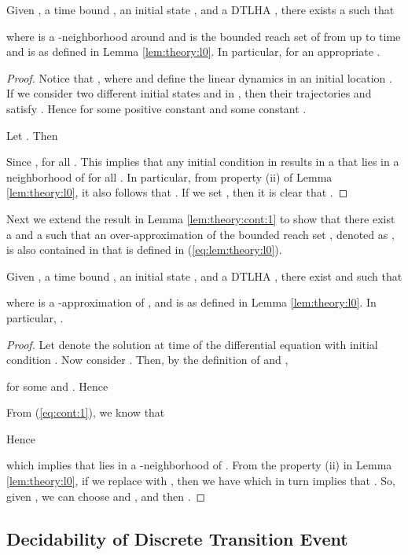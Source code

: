 \begin{lem} \label{lem:theory:cont:1}
Given , a time bound , an initial state , and a DTLHA , there exists a  such that 

where  is a -neighborhood around  and  is the bounded reach set of  from  up to time  and  is as defined in Lemma \ref{lem:theory:l0}. 
In particular,  for an appropriate .
\end{lem}
\begin{proof}
Notice that , where  and  define the linear dynamics in an initial location .
If we consider two different initial states  and  in , then their trajectories  and  satisfy .
Hence  for some positive constant  and some constant .

Let .
Then

Since ,  for all .
This implies that any initial condition  in  results in a  that lies in a  neighborhood of  for all . 
In particular, from property (ii) of Lemma \ref{lem:theory:l0}, it also follows that .
If we set , then it is clear that .
\end{proof}


Next we extend the result in Lemma \ref{lem:theory:cont:1} to show that there exist a  and a  such that an over-approximation of the bounded reach set  , denoted as , is also contained in  that is defined in (\ref{eq:lem:theory:l0}).


\begin{lem} \label{lem:theory:cont:2}
Given , a time bound , an initial state , and a DTLHA , there exist  and  such that 

where  is a -approximation of , and  is as defined in Lemma \ref{lem:theory:l0}.
In particular, .
\end{lem}
\begin{proof}
Let  denote the solution at time  of the differential equation  with initial condition .
Now consider . 
Then, by the definition of  and , 
 
for some  and . 
Hence

From (\ref{eq:cont:1}), we know that 

Hence 

which implies that  lies in a -neighborhood of .
From the property (ii) in Lemma \ref{lem:theory:l0}, if we replace  with , then we have  which in turn implies that .
So, given , we can choose  and , and then .
\end{proof}




\subsection{Decidability of Discrete Transition Event}  \label{sec:theory:trans}

